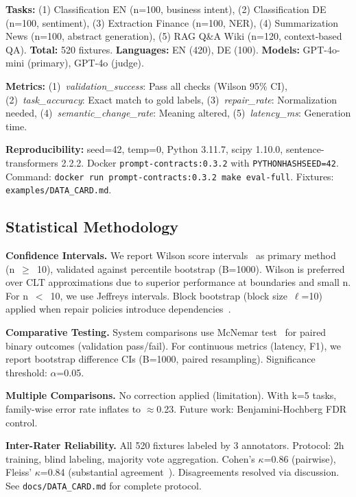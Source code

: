 \documentclass[sigconf]{acmart}
\begin{document}
\textbf{Tasks:} (1) Classification EN (n=100, business intent), (2) Classification DE (n=100, sentiment), (3) Extraction Finance (n=100, NER), (4) Summarization News (n=100, abstract generation), (5) RAG Q\&A Wiki (n=120, context-based QA). \textbf{Total:} 520 fixtures. \textbf{Languages:} EN (420), DE (100). \textbf{Models:} GPT-4o-mini (primary), GPT-4o (judge).

\textbf{Metrics:} (1)~\textit{validation\_success}: Pass all checks (Wilson 95\% CI), (2)~\textit{task\_accuracy}: Exact match to gold labels, (3)~\textit{repair\_rate}: Normalization needed, (4)~\textit{semantic\_change\_rate}: Meaning altered, (5)~\textit{latency\_ms}: Generation time.

\textbf{Reproducibility:} seed=42, temp=0, Python 3.11.7, scipy 1.10.0, sentence-transformers 2.2.2. Docker \texttt{prompt-contracts:0.3.2} with \texttt{PYTHONHASHSEED=42}. Command: \texttt{docker run prompt-contracts:0.3.2 make eval-full}. Fixtures: \texttt{examples/DATA\_CARD.md}.

\subsection{Statistical Methodology}

\textbf{Confidence Intervals.} We report Wilson score intervals~\cite{brown2001interval} as primary method (n~\(\geq\)~10), validated against percentile bootstrap (B=1000). Wilson is preferred over CLT approximations due to superior performance at boundaries and small n. For n~\(<\)~10, we use Jeffreys intervals. Block bootstrap (block size~\(\ell\)=10) applied when repair policies introduce dependencies~\cite{kunsch1989jackknife}.

\textbf{Comparative Testing.} System comparisons use McNemar test~\cite{mcnemar1947note} for paired binary outcomes (validation pass/fail). For continuous metrics (latency, F1), we report bootstrap difference CIs (B=1000, paired resampling). Significance threshold: \(\alpha\)=0.05.

\textbf{Multiple Comparisons.} No correction applied (limitation). With k=5 tasks, family-wise error rate inflates to \(\approx\)0.23. Future work: Benjamini-Hochberg FDR control.

\textbf{Inter-Rater Reliability.} All 520 fixtures labeled by 3 annotators. Protocol: 2h training, blind labeling, majority vote aggregation. Cohen's \(\kappa\)=0.86 (pairwise), Fleiss' \(\kappa\)=0.84 (substantial agreement~\cite{landis1977measurement}). Disagreements resolved via discussion. See \texttt{docs/DATA\_CARD.md} for complete protocol.
\end{document}

